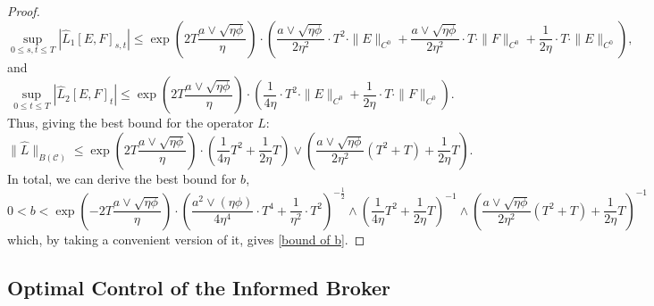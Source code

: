 \documentclass[10pt]{article}
\begin{document}
\begin{proof}
\begin{equation*}
        \sup_{0 \leq s,t \leq T} \left| \hat{L}_1 \left[E,F\right]_{s,t} \right| \leq \exp\left(2T\frac{a \vee \sqrt{\eta\phi}}{\eta}\right) \cdot \left( \frac{a \vee \sqrt{\eta\phi}}{2\eta^2} \cdot T^2 \cdot \|E\|_{C^0} + \frac{a \vee \sqrt{\eta\phi}}{2\eta^2} \cdot T \cdot \|F\|_{C^0} + \frac{1}{2\eta} \cdot T \cdot \|E\|_{C^0}\right),
    \end{equation*}
    and
    \begin{equation*}
        \sup_{0 \leq t \leq T} \left| \hat{L}_2 \left[E,F\right]_{t} \right| \leq \exp\left(2T\frac{a \vee \sqrt{\eta\phi}}{\eta}\right) \cdot \left( \frac 1{4\eta} \cdot T^2 \cdot \|E\|_{C^0} + \frac 1{2\eta} \cdot T \cdot \|F\|_{C^0}\right).
    \end{equation*}
    Thus, giving the best bound for the operator $L$:
    \begin{equation}\label{bound_of_hat_L}
        \|\hat{L}\|_{B(\mathcal{C})} \leq \exp\left(2T\frac{a \vee \sqrt{\eta\phi}}{\eta}\right) \cdot \left( \frac 1{4\eta} T^2 + \frac 1{2\eta} T \right) \vee \left( \frac{a \vee \sqrt{\eta\phi}}{2\eta^2} (T^2+T) + \frac 1{2\eta} T \right).
    \end{equation}
    In total, we can derive the best bound for $b$, 
    {\small
    $$
    0 < b < \exp\left( - 2T\frac{a \vee \sqrt{\eta\phi}}{\eta}\right) \cdot \left(\frac{a^2 \vee (\eta\phi)}{4\eta^4} \cdot T^4 + \frac{1}{\eta^2} \cdot T^2\right)^{-\frac 12} \wedge \left( \frac 1{4\eta} T^2 + \frac 1{2\eta} T \right)^{-1} \wedge \left( \frac{a \vee \sqrt{\eta\phi}}{2\eta^2} (T^2+T) + \frac 1{2\eta} T \right)^{-1}
    $$}
    which, by taking a convenient version of it, gives \eqref{bound of b}.
\end{proof}

\subsection{Optimal Control of the Informed Broker}\label{Optimal_Control_Broker_Mean_Field_Setting}
\end{document}
